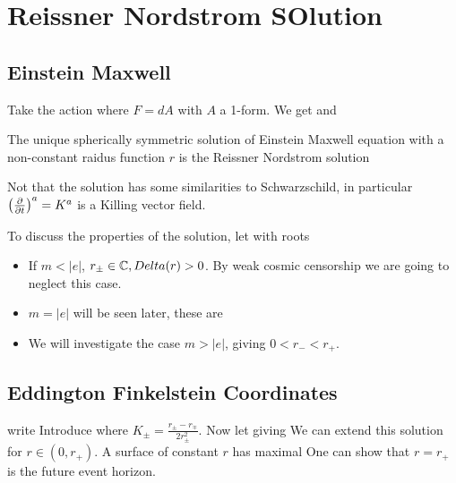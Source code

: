 \documentclass{article}
\begin{document}
\section{Reissner Nordstrom SOlution}

\subsection{Einstein Maxwell}
Take the action 
where $F= dA$ with $A$ a 1-form. We get 
and 

\begin{theorem}
The unique spherically symmetric solution of Einstein Maxwell equation with a non-constant raidus function $r$ is the Reissner Nordstrom solution 
\end{theorem}
Not that the solution has some similarities to Schwarzschild, in particular $\left( \frac{\partial}{\partial t} \right)^a = K^a$ is a Killing vector field. 

To discuss the properties of the solution, let 
with roots 
\begin{itemize}
    \item If $m < |e|$, $r_\pm \in \mathbb{C}, Delta(r) > 0$. By weak cosmic censorship we are going to neglect this case. 
    \item $m = |e|$ will be seen later, these are  
    \item We will investigate the case $m > |e|$, giving $0 < r_- < r_+$. 
\end{itemize}

\subsection{Eddington Finkelstein Coordinates}
write 
Introduce 
where $K_\pm = \frac{r_\pm - r_\mp}{2r_\pm^2}$. Now let
 giving 
We can extend this solution for $r \in (0,r_+)$. A surface of constant $r$ has maximal 
One can show that $r=r_+$ is the future event horizon. 
\end{document}
